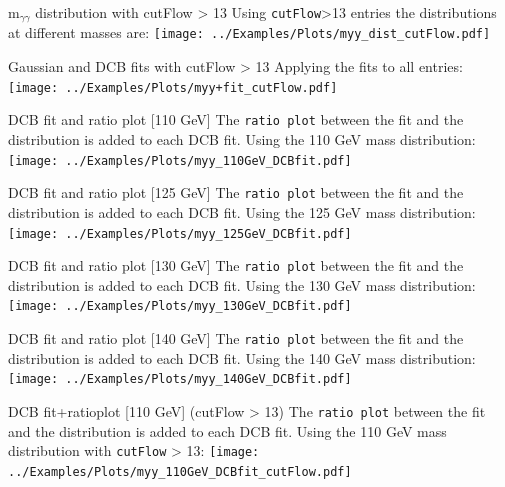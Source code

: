 \documentclass[10pt,UKenglish, leqno, xcolor = dvipsnames]{beamer}
\begin{document}
		\begin{frame}{m$_{\gamma\gamma}$ distribution with cutFlow > 13}
			\vfill
			Using \texttt{cutFlow}>13 entries the distributions at different masses are:
			\texttt{[image: ../Examples/Plots/myy\_dist\_cutFlow.pdf]}
			\vfill
		\end{frame}
	
		\begin{frame}{Gaussian and DCB fits with cutFlow > 13}
			\vfill
			Applying the fits to all entries:
			\texttt{[image: ../Examples/Plots/myy+fit\_cutFlow.pdf]}
			\vfill
		\end{frame}
	
		\begin{frame}{DCB fit and ratio plot [110 GeV]}
			\vfill
			The \texttt{ratio plot} between the fit and the distribution is added to each DCB fit. Using the 110 GeV mass distribution:
			\texttt{[image: ../Examples/Plots/myy\_110GeV\_DCBfit.pdf]}
			\vfill
		\end{frame}
	
		\begin{frame}{DCB fit and ratio plot [125 GeV]}
			\vfill
			The \texttt{ratio plot} between the fit and the distribution is added to each DCB fit. Using the 125 GeV mass distribution:
			\texttt{[image: ../Examples/Plots/myy\_125GeV\_DCBfit.pdf]}
			\vfill
		\end{frame}
	
		\begin{frame}{DCB fit and ratio plot [130 GeV]}
			\vfill
			The \texttt{ratio plot} between the fit and the distribution is added to each DCB fit. Using the 130 GeV mass distribution:
			\texttt{[image: ../Examples/Plots/myy\_130GeV\_DCBfit.pdf]}
			\vfill
		\end{frame}
	
		\begin{frame}{DCB fit and ratio plot [140 GeV]}
			\vfill
			The \texttt{ratio plot} between the fit and the distribution is added to each DCB fit. Using the 140 GeV mass distribution:
			\texttt{[image: ../Examples/Plots/myy\_140GeV\_DCBfit.pdf]}
			\vfill
		\end{frame}
	
		\begin{frame}{DCB fit+ratioplot [110 GeV] (cutFlow > 13)}
			\vfill
			The \texttt{ratio plot} between the fit and the distribution is added to each DCB fit. Using the 110 GeV mass distribution with \texttt{cutFlow} > 13:
			\texttt{[image: ../Examples/Plots/myy\_110GeV\_DCBfit\_cutFlow.pdf]}
			\vfill
		\end{frame}
		
\end{document}
